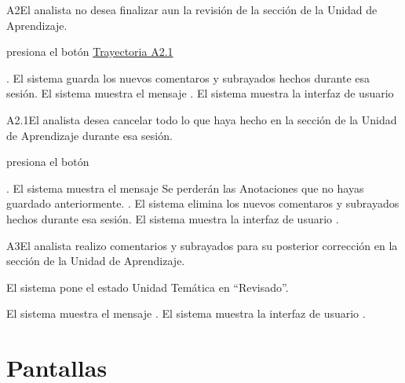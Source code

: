 	
\begin{UCtrayectoriaA}{A2}{El analista no desea finalizar aun la revisión de la sección de la Unidad de Aprendizaje.}

    \hypertarget{SP2-CU12-A2}{\UCpaso[\UCactor] presiona el botón  \hyperlink{SP2-CU12-A2.1}{Trayectoria A2.1}}. 
    \UCpaso El sistema guarda los nuevos comentaros y subrayados hechos durante esa sesión.
    \UCpaso El sistema muestra el mensaje .
    \UCpaso El sistema muestra la interfaz de usuario 
\end{UCtrayectoriaA}

\begin{UCtrayectoriaA}{A2.1}{El analista desea cancelar todo lo que haya hecho en la sección de la Unidad de Aprendizaje durante esa sesión.}

	\hypertarget{SP2-CU12-A2.1}{\UCpaso[\UCactor] presiona el botón }. 
    \UCpaso El sistema muestra el mensaje 
Se perderán las Anotaciones que no hayas guardado anteriormente. .
    \UCpaso El sistema elimina los nuevos comentaros y subrayados hechos durante esa sesión.
    \UCpaso El sistema muestra la interfaz de usuario .
\end{UCtrayectoriaA}

	
\begin{UCtrayectoriaA}{A3}{El analista realizo comentarios y subrayados para su posterior corrección en la sección de la Unidad de Aprendizaje.} 

	\hypertarget{SP2-CU12-A3}{\UCpaso El sistema pone el estado Unidad Temática en “Revisado”.}
    \UCpaso El sistema muestra el mensaje .
    \UCpaso El sistema muestra la interfaz de usuario .
\end{UCtrayectoriaA}

\chapter{Pantallas}


